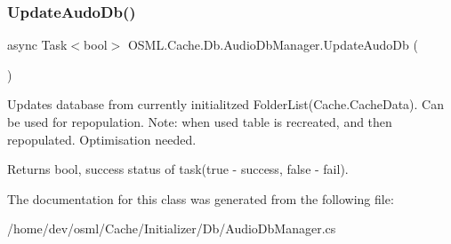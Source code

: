 \subsubsection{\texorpdfstring{UpdateAudoDb()}{UpdateAudoDb()}}
{\footnotesize\ttfamily async Task$<$bool$>$ O\+S\+M\+L.\+Cache.\+Db.\+Audio\+Db\+Manager.\+Update\+Audo\+Db (\begin{DoxyParamCaption}{ }\end{DoxyParamCaption})\hspace{0.3cm}{\ttfamily [inline]}}



Updates database from currently initialitzed Folder\+List(Cache.\+Cache\+Data). Can be used for repopulation. Note\+: when used table is recreated, and then repopulated. Optimisation needed. 

\begin{DoxyReturn}{Returns}
bool, success status of task(true -\/ success, false -\/ fail). 
\end{DoxyReturn}


The documentation for this class was generated from the following file\+:\begin{DoxyCompactItemize}
\item 
/home/dev/osml/\+Cache/\+Initializer/\+Db/Audio\+Db\+Manager.\+cs\end{DoxyCompactItemize}
